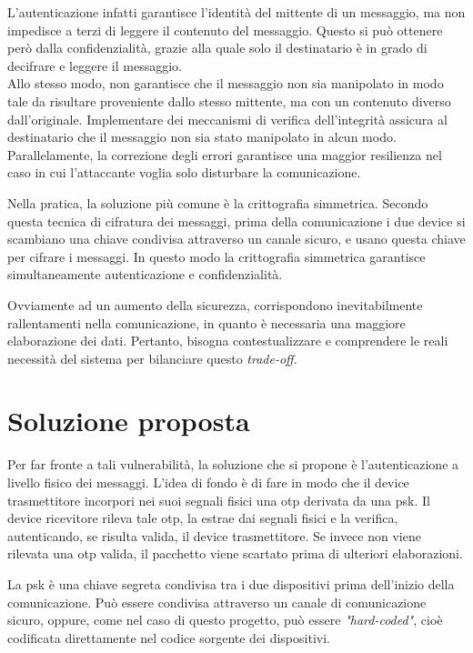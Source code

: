 L'autenticazione infatti garantisce l'identità del mittente di un messaggio, ma non impedisce a terzi di leggere il contenuto del messaggio. Questo si può ottenere però dalla confidenzialità, grazie alla quale solo il destinatario è in grado di decifrare e leggere il messaggio.\\
Allo stesso modo, non garantisce che il messaggio non sia manipolato in modo tale da risultare proveniente dallo stesso mittente, ma con un contenuto diverso dall'originale. Implementare dei meccanismi di verifica dell'integrità assicura al destinatario che il messaggio non sia stato manipolato in alcun modo.\\
Parallelamente, la correzione degli errori garantisce una maggior resilienza nel caso in cui l'attaccante voglia solo disturbare la comunicazione.

Nella pratica, la soluzione più comune è la crittografia simmetrica. Secondo questa tecnica di cifratura dei messaggi, prima della comunicazione i due device si scambiano una chiave condivisa attraverso un canale sicuro, e usano questa chiave per cifrare i messaggi. In questo modo la crittografia simmetrica garantisce simultaneamente autenticazione e confidenzialità.

Ovviamente ad un aumento della sicurezza, corrispondono inevitabilmente rallentamenti nella comunicazione, in quanto è necessaria una maggiore elaborazione dei dati. Pertanto, bisogna contestualizzare e comprendere le reali necessità del sistema per bilanciare questo \textit{trade-off}.

\section{Soluzione proposta}

Per far fronte a tali vulnerabilità, la soluzione che si propone è l'autenticazione a livello fisico dei messaggi. L'idea di fondo è di fare in modo che il device trasmettitore incorpori nei suoi segnali fisici una \gls{otp} derivata da una \gls{psk}\glsfirstoccur. Il device ricevitore rileva tale \gls{otp}, la estrae dai segnali fisici e la verifica, autenticando, se risulta valida, il device trasmettitore. Se invece non viene rilevata una \gls{otp} valida, il pacchetto viene scartato prima di ulteriori elaborazioni.

La \gls{psk} è una chiave segreta condivisa tra i due dispositivi prima dell'inizio della comunicazione. Può essere condivisa attraverso un canale di comunicazione sicuro, oppure, come nel caso di questo progetto, può essere \textit{"hard-coded"}, cioè codificata direttamente nel codice sorgente dei dispositivi.


